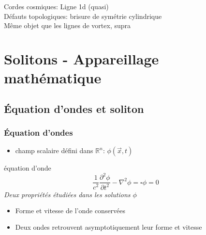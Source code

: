 \documentclass[handout]{beamer}
\begin{document}
  
\begin{frame}
Cordes cosmiques: Ligne 1d (quasi) \\
Défauts topologiques: brisure de symétrie cylindrique \\
Même objet que les lignes de vortex, supra \\
 
\end{frame}





\section{Solitons - Appareillage mathématique }

\subsection{Équation d'ondes et soliton}
\begin{frame}
\frametitle{Équation d'ondes}
\begin{itemize}
\item  champ scalaire défini dans $\mathbb{R}^n$: $\phi(\vec{x},t)$\\
\end{itemize}
\begin{block}{équation d'onde}
\begin{equation}
\frac{1}{c^2}\frac{\partial^2 \phi}{\partial t^2} - \nabla^2 \phi = \square \phi = 0 
\end{equation}
\textit{Deux propriétés étudiées dans les solutions $\phi$}
\begin{itemize}
\item Forme et vitesse de l'onde conservées\\
\item Deux ondes retrouvent asymptotiquement leur forme et vitesse\\
\end{itemize}
\end{block} 
\end{frame}
\end{document}

